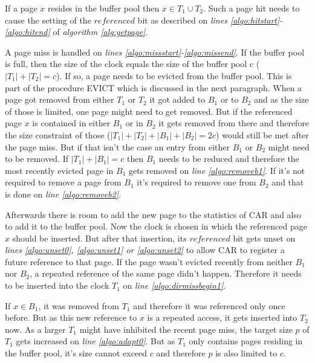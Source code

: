 	If a page $x$ resides in the buffer pool then $x \in T_1 \cup T_2$. Such a page hit needs to cause the setting of the $referenced$ bit as described on \emph{lines \ref{algo:hitstart}-\ref{algo:hitend}} of \emph{algorithm \ref{alg:getpage}}.
	
	A page miss is handled on \emph{lines \ref{algo:missstart}-\ref{algo:missend}}. If the buffer pool is full, then the size of the clock equals the size of the buffer pool c ($\left|T_1\right| + \left|T_2\right| = c$). If so, a page needs to be evicted from the buffer pool. This is part of the procedure EVICT which is discussed in the next paragraph. When a page got removed from either $T_1$ or $T_2$ it got added to $B_1$ or to $B_2$ and as the size of those is limited, one page might need to get removed. But if the referenced page $x$ is contained in either $B_1$ or in $B_2$ it gets removed from there and therefore the size constraint of those ($\left|T_1\right| + \left|T_2\right| + \left|B_1\right| + \left|B_2\right| = 2c$) would still be met after the page miss. But if that isn't the case an entry from either $B_1$ or $B_2$ might need to be removed. If $\left|T_1\right| + \left|B_1\right| = c$ then $B_1$ needs to be reduced and therefore the most recently evicted page in $B_1$ gets removed on \emph{line \ref{algo:removeb1}}. If it's not required to remove a page from $B_1$ it's required to remove one from $B_2$ and that is done on \emph{line \ref{algo:removeb2}}.
	
	Afterwards there is room to add the new page to the statistics of CAR and also to add it to the buffer pool. Now the clock is chosen in which the referenced page $x$ should be inserted. But after that insertion, its $referenced$ bit gets unset on \emph{lines \ref{algo:unset0}, \ref{algo:unset1} or \ref{algo:unset2}} to allow CAR to register a future reference to that page. If the page wasn't evicted recently from neither $B_1$ nor $B_2$, a repeated reference of the same page didn't happen. Therefore it needs to be inserted into the clock $T_1$ on \emph{line \ref{algo:dirmissbegin1}}.
	
	If $x \in B_1$, it was removed from $T_1$ and therefore it was referenced only once before. But as this new reference to $x$ is a repeated access, it gets inserted into $T_2$ now. As a larger $T_1$ might have inhibited the recent page miss, the target size $p$ of $T_1$ gets increased on \emph{line \ref{algo:adapt0}}. But as $T_1$ only contains pages residing in the buffer pool, it's size cannot exceed $c$ and therefore $p$ is also limited to $c$.
	
